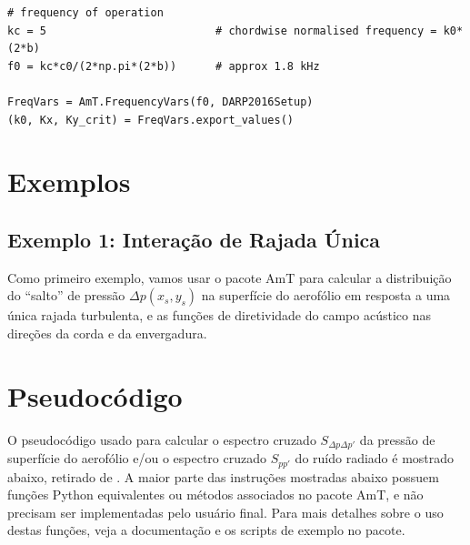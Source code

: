 \documentclass[a4paper, 11pt, twoside]{article}
\begin{document}
\begin{lstlisting}[caption={Criando variáveis relacionadas à frequência},label={lst:FrequencyVars}]
# frequency of operation
kc = 5                          # chordwise normalised frequency = k0*(2*b)
f0 = kc*c0/(2*np.pi*(2*b))      # approx 1.8 kHz

FreqVars = AmT.FrequencyVars(f0, DARP2016Setup)
(k0, Kx, Ky_crit) = FreqVars.export_values()
\end{lstlisting}

\section{Exemplos}

\subsection{Exemplo 1: Interação de Rajada Única}

Como primeiro exemplo, vamos usar o pacote AmT para calcular a distribuição do ``salto'' de pressão $\Delta p(x_s, y_s)$ na superfície do aerofólio em resposta a uma única rajada turbulenta, e as funções de diretividade do campo acústico nas direções da corda e da envergadura.



\section{Pseudocódigo}

O pseudocódigo usado para calcular o espectro cruzado $S_{\Delta p \Delta p'}$ da pressão de superfície do aerofólio e/ou o espectro cruzado $S_{pp'}$ do ruído radiado é mostrado abaixo, retirado de \cite{Casagrande_etal2020}. A maior parte das instruções mostradas abaixo possuem funções Python equivalentes ou métodos associados no pacote AmT, e não precisam ser implementadas pelo usuário final. Para mais detalhes sobre o uso destas funções, veja a documentação e os scripts de exemplo no pacote.
\end{document}
